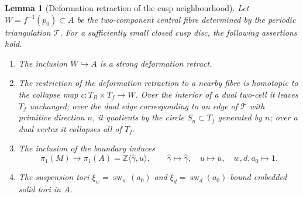 \documentclass[11pt]{article}
\newtheorem{lemma}[theorem]{Lemma}
\theoremstyle{definition}
\theoremstyle{remark}
\numberwithin{equation}{section}
\begin{document}
\begin{lemma}[Deformation retraction of the cusp neighbourhood]\label{lem:cusp-retraction}
Let $W=f^{-1}(p_0)\subset A$ be the two-component central fibre determined
by the periodic triangulation $\mathcal T$.  For
a sufficiently small closed cusp disc, the following assertions hold.
\begin{enumerate}
\item The inclusion $W\hookrightarrow A$ is a strong deformation
retract.
\item The restriction of the deformation retraction to a nearby fibre is
homotopic to the collapse map
$c:T_B\times T_f\to W$.
Over the interior of a dual two-cell it leaves $T_f$ unchanged; over the
dual edge corresponding to an edge of $\mathcal T$ with primitive
direction $n$, it quotients by the circle $S_n\subset T_f$ generated by
$n$; over a dual vertex it collapses all of $T_f$.
\item The inclusion of the boundary induces
\begin{equation}\label{eq:cusp-pi1-map}
 \pi_1(M)\longrightarrow\pi_1(A)=\mathbb Z\langle \widehat\gamma,u\rangle,
 \qquad
 \widehat\gamma\mapsto\widehat\gamma,\quad
 u\mapsto u,\quad w,d,a_0\mapsto1.
\end{equation}
\item The suspension tori $\xi_w=\operatorname{sw}_{w}(a_0)$ and
$\xi_d=\operatorname{sw}_{d}(a_0)$
bound embedded solid tori in $A$.
\end{enumerate}
\end{lemma}
\end{document}
